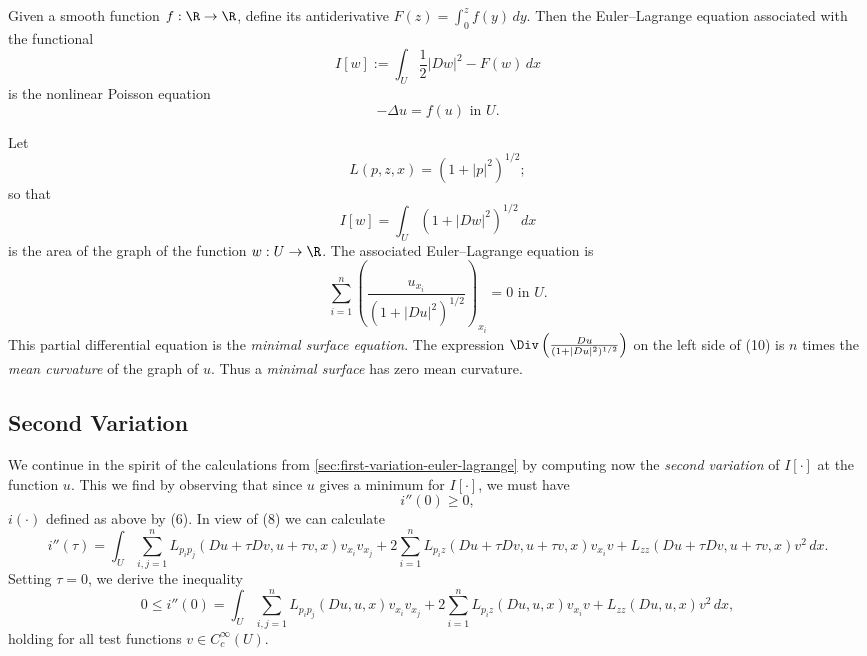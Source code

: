 \begin{example}
\label{ex:nonlinear-poisson-equation-calculus-of-variations}
Given a smooth function $f : \R \to \R$, define its antiderivative $F(z) = \int_0^z f(y)\, dy$. Then the Euler--Lagrange equation associated with the functional
\[
I[w] := \int_U \frac{1}{2}|Dw|^2 - F(w)\, dx
\]
is the nonlinear Poisson equation
\[
-\Delta u = f(u) \text{ in } U.
\]
\end{example}

\begin{example}
\label{ex:minimal-surfaces-calculus-of-variations}
Let
\[
L(p, z, x) = (1 + |p|^2)^{1/2};
\]
so that
\[
I[w] = \int_U (1 + |Dw|^2)^{1/2} \, dx
\]
is the area of the graph of the function $w : U \to \R$. The associated Euler--Lagrange equation is
\[
\sum_{i=1}^{n} \left( \frac{u_{x_i}}{(1 + |Du|^2)^{1/2}} \right)_{x_i} = 0 \text{ in } U.
\tag{10}
\]
This partial differential equation is the \textit{minimal surface equation}. The expression $\Div\left(\frac{Du}{(1+|Du|^2)^{1/2}}\right)$ on the left side of (10) is $n$ times the \textit{mean curvature} of the graph of $u$. Thus a \textit{minimal surface} has zero mean curvature.
\end{example}

\begin{figure}[h]\centering
\end{figure}

\subsection{Second Variation}
\label{sec:second-variation-calculus-of-variations}

We continue in the spirit of the calculations from \cref{sec:first-variation-euler-lagrange} by computing now the \textit{second variation} of $I[\cdot]$ at the function $u$. This we find by observing that since $u$ gives a minimum for $I[\cdot]$, we must have
\[
i''(0) \geq 0,
\]
$i(\cdot)$ defined as above by (6). In view of (8) we can calculate
\[
i''(\tau) = \int_U \sum_{i,j=1}^n L_{p_i p_j}(Du + \tau Dv, u + \tau v, x) v_{x_i} v_{x_j}
+ 2 \sum_{i=1}^n L_{p_i z}(Du + \tau Dv, u + \tau v, x) v_{x_i} v
+ L_{zz}(Du + \tau Dv, u + \tau v, x) v^2 \, dx.
\]
Setting $\tau = 0$, we derive the inequality
\[
0 \leq i''(0) = \int_U \sum_{i,j=1}^n L_{p_i p_j}(Du, u, x) v_{x_i} v_{x_j}
+ 2 \sum_{i=1}^n L_{p_i z}(Du, u, x) v_{x_i} v + L_{zz}(Du, u, x) v^2 \, dx,
\tag{11}
\]
holding for all test functions $v \in C_c^\infty(U)$.

